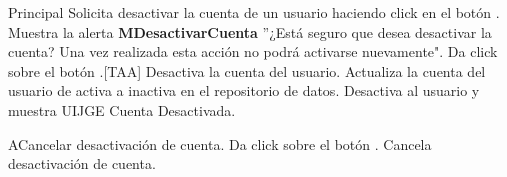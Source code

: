 \begin{UCtrayectoria}{Principal}
  \UCpaso[\UCactor] Solicita desactivar la cuenta de un usuario haciendo click en el botón .
  \UCpaso Muestra la alerta {\bf MDesactivarCuenta} ''¿Está seguro que desea desactivar la cuenta? Una vez realizada esta acción no podrá activarse nuevamente".
  \UCpaso[\UCactor] Da click sobre el botón .[TAA]
  \UCpaso Desactiva la cuenta del usuario.
  \UCpaso Actualiza la cuenta del usuario de activa a inactiva en el repositorio de datos.
  \UCpaso Desactiva al usuario y muestra UIJGE Cuenta Desactivada.
\end{UCtrayectoria}

\begin{UCtrayectoriaA}{A}{Cancelar desactivación de cuenta.} 
  \UCpaso[\UCactor] Da click sobre el botón .
  \UCpaso Cancela desactivación de cuenta.
\end{UCtrayectoriaA}



